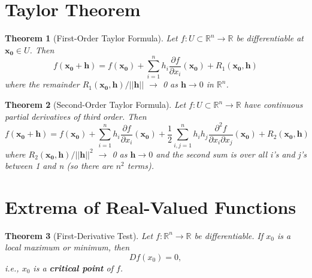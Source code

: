 \documentclass{article}
\newtheorem{theorem}{Theorem}
\begin{document}
\section{Taylor Theorem}
\begin{theorem}[First-Order Taylor Formula]
    Let \(f: U \subset \mathbb{R}^n \to \mathbb{R}\) be differentiable at \(\mathbf{x_0} \in U\). Then 
    \[f(\mathbf{x_0} + \mathbf{h}) = f(\mathbf{x_0}) + \sum_{i=1}^n h_i \frac{\partial f}{\partial x_i}(\mathbf{x_0}) + R_1(\mathbf{x_0}, \mathbf{h})\]
    where the remainder \(R_1(\mathbf{x_0}, \mathbf{h})/||\mathbf{h}||\) \(\rightarrow\) 0 as \(\mathbf{h} \to 0\) in \(\mathbb{R}^n\).
\end{theorem}
\begin{theorem}[Second-Order Taylor Formula]
    Let \(f: U \subset \mathbb{R}^n \to \mathbb{R}\) have continuous partial derivatives of third order. Then 
    \[f(\mathbf{x_0} + \mathbf{h}) = f(\mathbf{x_0}) + \sum_{i=1}^n h_i \frac{\partial f}{\partial x_i}(\mathbf{x_0}) + \frac{1}{2}\sum_{i,j=1}^n h_i h_j \frac{\partial^2 f}{\partial x_i \partial x_j}(\mathbf{x_0}) + R_2(\mathbf{x_0}, \mathbf{h})\]
    where \(R_2(\mathbf{x_0}, \mathbf{h})/||\mathbf{h}||^2\) \(\rightarrow\) 0 as \(\mathbf{h} \to 0\) and the second sum is over all i's and j's between 1 and n (so there are \(n^2\) terms).
\end{theorem}

\section{Extrema of Real-Valued Functions}
\begin{theorem}[First-Derivative Test]
    Let $f:\mathbb{R}^n \to \mathbb{R}$ be differentiable. If $x_0$ is a local maximum or minimum, then
    \[Df(x_0) = 0,\]
    i.e., $x_0$ is a \textbf{critical point} of $f$.
\end{theorem}
\end{document}
